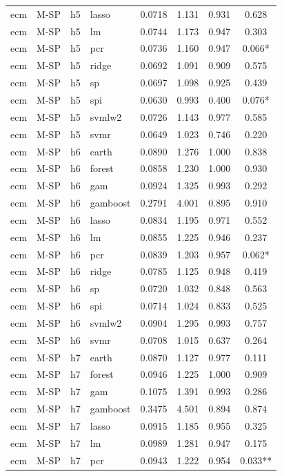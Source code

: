 \begin{ThreePartTable}
\begin{longtable}[t]{llclcccc}
ecm & M-SP & h5 & lasso & 0.0718 & 1.131 & 0.931 & 0.628\\
ecm & M-SP & h5 & lm & 0.0744 & 1.173 & 0.947 & 0.303\\
ecm & M-SP & h5 & pcr & 0.0736 & 1.160 & 0.947 & 0.066*\\
ecm & M-SP & h5 & ridge & 0.0692 & 1.091 & 0.909 & 0.575\\
ecm & M-SP & h5 & sp & 0.0697 & 1.098 & 0.925 & 0.439\\
ecm & M-SP & h5 & spi & 0.0630 & 0.993 & 0.400 & 0.076*\\
ecm & M-SP & h5 & svmlw2 & 0.0726 & 1.143 & 0.977 & 0.585\\
ecm & M-SP & h5 & svmr & 0.0649 & 1.023 & 0.746 & 0.220\\
\addlinespace
ecm & M-SP & h6 & earth & 0.0890 & 1.276 & 1.000 & 0.838\\
ecm & M-SP & h6 & forest & 0.0858 & 1.230 & 1.000 & 0.930\\
ecm & M-SP & h6 & gam & 0.0924 & 1.325 & 0.993 & 0.292\\
ecm & M-SP & h6 & gamboost & 0.2791 & 4.001 & 0.895 & 0.910\\
ecm & M-SP & h6 & lasso & 0.0834 & 1.195 & 0.971 & 0.552\\
ecm & M-SP & h6 & lm & 0.0855 & 1.225 & 0.946 & 0.237\\
ecm & M-SP & h6 & pcr & 0.0839 & 1.203 & 0.957 & 0.062*\\
ecm & M-SP & h6 & ridge & 0.0785 & 1.125 & 0.948 & 0.419\\
ecm & M-SP & h6 & sp & 0.0720 & 1.032 & 0.848 & 0.563\\
ecm & M-SP & h6 & spi & 0.0714 & 1.024 & 0.833 & 0.525\\
ecm & M-SP & h6 & svmlw2 & 0.0904 & 1.295 & 0.993 & 0.757\\
ecm & M-SP & h6 & svmr & 0.0708 & 1.015 & 0.637 & 0.264\\
\addlinespace
ecm & M-SP & h7 & earth & 0.0870 & 1.127 & 0.977 & 0.111\\
ecm & M-SP & h7 & forest & 0.0946 & 1.225 & 1.000 & 0.909\\
ecm & M-SP & h7 & gam & 0.1075 & 1.391 & 0.993 & 0.286\\
ecm & M-SP & h7 & gamboost & 0.3475 & 4.501 & 0.894 & 0.874\\
ecm & M-SP & h7 & lasso & 0.0915 & 1.185 & 0.955 & 0.325\\
ecm & M-SP & h7 & lm & 0.0989 & 1.281 & 0.947 & 0.175\\
ecm & M-SP & h7 & pcr & 0.0943 & 1.222 & 0.954 & 0.033**\\

\end{longtable}
\end{ThreePartTable}
